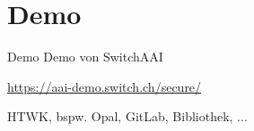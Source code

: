 
\section{Demo}

\begin{frame}{Demo}
    Demo von SwitchAAI

    \url{https://aai-demo.switch.ch/secure/}

    HTWK, bspw. Opal, GitLab, Bibliothek, ...
\end{frame}
